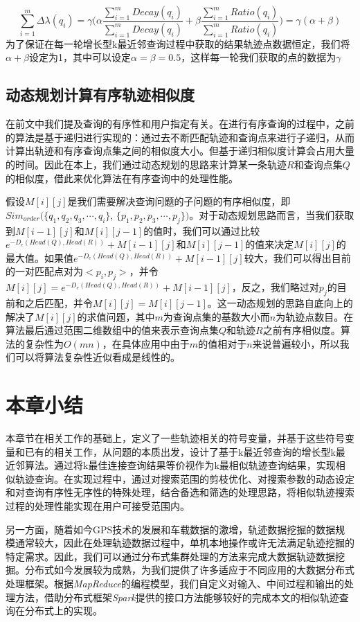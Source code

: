 \begin{displaymath}
\sum_{i=1}^{m}\Delta\lambda(q_i)=\gamma\big( \alpha\frac{\sum_{i=1}^{m}Decay(q_i)}{\sum_{i=1}^{m}Decay(q_i)} + \beta\frac{\sum_{i=1}^{m}Ratio(q_i)}{\sum_{i=1}^{m}Ratio(q_i)} \big)=\gamma(\alpha+\beta)
\end{displaymath}
为了保证在每一轮增长型k最近邻查询过程中获取的结果轨迹点数据恒定，我们将$\alpha+\beta$设定为1，其中可以设定$\alpha=\beta=0.5$，这样每一轮我们获取的点的数据为$\gamma$

\subsection{动态规划计算有序轨迹相似度}
\label{subsec:dp-order-sim}
在前文中我们提及查询的有序性和用户指定有关。在进行有序查询的过程中，之前的算法是基于递归进行实现的：通过去不断匹配轨迹和查询点来进行子递归，从而计算出轨迹和有序查询点集之间的相似度大小。但基于递归相似度计算会占用大量的时间。因此在本上，我们通过动态规划的思路来计算某一条轨迹$R$和查询点集$Q$的相似度，借此来优化算法在有序查询中的处理性能。

假设$M[i][j]$是我们需要解决查询问题的子问题的有序相似度，即$Sim_{order}(\{q_1,q_2,q_3,\cdots,q_i\}$, $\{p_1,p_2,p_3,\cdots,p_j\})$。对于动态规划思路而言，当我们获取到$M[i-1][j]$和$M[i][j-1]$的值时，我们可以通过比较$e^{-D_{e}(Head(Q),Head(R))} + M[i-1][j]$和$M[i][j-1]$的值来决定$M[i][j]$的最大值。如果值$e^{-D_{e}(Head(Q),Head(R))} + M[i-1][j]$较大，我们可以得出目前的一对匹配点对为$<p_i, p_j>$，并令$M[i][j] = e^{-D_{e}(Head(Q),Head(R))} + M[i-1][j]$，反之，我们略过对$p_j$的目前和之后匹配，并令$M[i][j]=M[i][j-1]$。这一动态规划的思路自底向上的解决了$M[i][j]$的求值问题，其中$m$为查询点集的基数大小而$n$为轨迹点数目。在算法最后通过范围二维数组中的值来表示查询点集$Q$和轨迹$R$之前有序相似度。算法的复杂性为$O(mn)$，在具体应用中由于$m$的值相对于$n$来说普遍较小，所以我们可以将算法复杂性近似看成是线性的。


\section{本章小结}
\label{sec:implementation conclusion}
本章节在相关工作的基础上，定义了一些轨迹相关的符号变量，并基于这些符号变量和已有的相关工作，从问题的本质出发，设计了基于k最近邻查询的增长型k最近邻算法。通过将k最佳连接查询结果等价视作为k最相似轨迹查询结果，实现相似轨迹查询。在实现过程中，通过对搜索范围的剪枝优化、对搜索参数的动态设定和对查询有序性无序性的特殊处理，结合备选和筛选的处理思路，将相似轨迹搜索过程的处理性能实现在用户可接受范围内。

另一方面，随着如今GPS技术的发展和车载数据的激增，轨迹数据挖掘的数据规模通常较大，因此在处理轨迹数据过程中，单机本地操作或许无法满足轨迹挖掘的特定需求。因此，我们可以通过分布式集群处理的方法来完成大数据轨迹数据挖掘。分布式如今发展较为成熟，为我们提供了许多适应于不同应用的大数据分布式处理框架。根据\emph{MapReduce}的编程模型，我们自定义对输入、中间过程和输出的处理方法，借助分布式框架\emph{Spark}提供的接口方法能够较好的完成本文的相似轨迹查询在分布式上的实现。